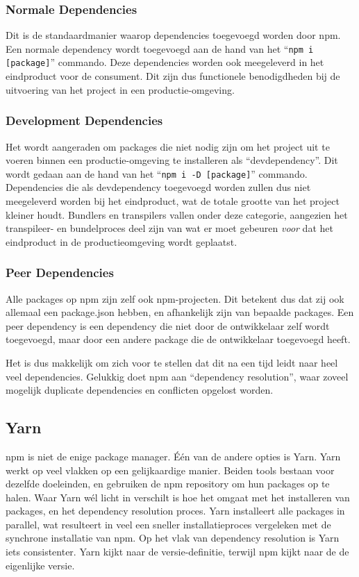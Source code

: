 \subsubsection{Normale Dependencies}

Dit is de standaardmanier waarop dependencies toegevoegd worden door npm. Een normale dependency wordt toegevoegd aan de hand van het ``\lstinline{npm i [package]}'' commando. Deze dependencies worden ook meegeleverd in het eindproduct voor de consument. Dit zijn dus functionele benodigdheden bij de uitvoering van het project in een productie-omgeving.

\subsubsection{Development Dependencies}

Het wordt aangeraden om packages die niet nodig zijn om het project uit te voeren binnen een productie-omgeving te installeren als ``devdependency''. Dit wordt gedaan aan de hand van het ``\lstinline{npm i -D [package]}'' commando. Dependencies die als devdependency toegevoegd worden zullen dus niet meegeleverd worden bij het eindproduct, wat de totale grootte van het project kleiner houdt. Bundlers en transpilers vallen onder deze categorie, aangezien het transpileer- en bundelproces deel zijn van wat er moet gebeuren \emph{voor} dat het eindproduct in de productieomgeving wordt geplaatst.

\subsubsection{Peer Dependencies}

Alle packages op npm zijn zelf ook npm-projecten. Dit betekent dus dat zij ook allemaal een package.json hebben, en afhankelijk zijn van bepaalde packages. Een peer dependency is een dependency die niet door de ontwikkelaar zelf wordt toegevoegd, maar door een andere package die de ontwikkelaar toegevoegd heeft.

Het is dus makkelijk om zich voor te stellen dat dit na een tijd leidt naar heel veel dependencies. Gelukkig doet npm aan ``dependency resolution'', waar zoveel mogelijk duplicate dependencies en conflicten opgelost worden.

\subsection{Yarn}

npm is niet de enige package manager. Één van de andere opties is Yarn. Yarn werkt op veel vlakken op een gelijkaardige manier. Beiden tools bestaan voor dezelfde doeleinden, en gebruiken de npm repository om hun packages op te halen. Waar Yarn wél licht in verschilt is hoe het omgaat met het installeren van packages, en het dependency resolution proces. Yarn installeert alle packages in parallel, wat resulteert in veel een sneller installatieproces vergeleken met de synchrone installatie van npm. Op het vlak van dependency resolution is Yarn iets consistenter. Yarn kijkt naar de versie-definitie, terwijl npm kijkt naar de de eigenlijke versie. \autocite{Kay2021} 

